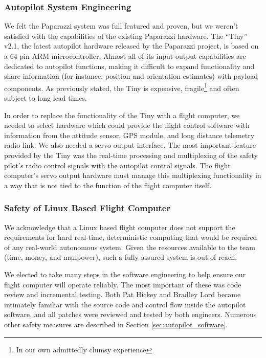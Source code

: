 \documentclass[10pt]{report}
\begin{document}
\subsubsection{Autopilot System Engineering}

We felt the Paparazzi system was full featured and proven, but we weren't satisfied with the capabilities of the existing Paparazzi hardware. The ``Tiny'' v2.1\cite{paparazzi_tinyv21}, the latest autopilot hardware released by the Paparazzi project, is based on a 64 pin ARM microcontroller. Almost all of its input-output capabilities are dedicated to autopilot functions, making it difficult to expand functionality and share information (for instance, position and orientation estimates) with payload components. As previously stated, the Tiny is expensive, fragile\footnote{In our own admittedly clumsy experience} and often subject to long lead times. 

In order to replace the functionality of the Tiny with a flight computer, we needed to select hardware which could provide the flight control software with information from the attitude sensor, GPS module, and long distance telemetry radio link. We also needed a servo output interface. The most important feature provided by the Tiny was the real-time processing and multiplexing of the safety pilot's radio control signals with the autopilot control signals. The flight computer's servo output hardware must manage this multiplexing functionality in a way that is not tied to the function of the flight computer itself. 

\subsubsection{Safety of Linux Based Flight Computer}

We acknowledge that a Linux based flight computer does not support the requirements for hard real-time, deterministic computing that would be required of any real-world autonomous system. Given the resources available to the team (time, money, and manpower), such a fully assured system is out of reach.

We elected to take many steps in the software engineering to help ensure our flight computer will operate reliably. The most important of these was code review and incremental testing. Both Pat Hickey and Bradley Lord became intimately familiar with the source code and control flow inside the autopilot software, and all patches were reviewed and tested by both engineers. Numerous other safety measures are described in Section \ref{sec:autopilot_software}.
\end{document}
